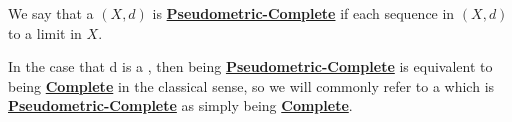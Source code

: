 \label{def:pseudometriccomplete}
\newcommand{\PseudometricComplete}[0]{\textbf{\hyperref[def:pseudometriccomplete]{Pseudometric-Complete}}\xspace}
\newcommand{\Complete}[0]{\textbf{\hyperref[def:pseudometriccomplete]{Complete}}\xspace}
\begin{df}
    We say that a \PseudometricSpace $(X,d)$ is 
    \PseudometricComplete if each 
	\PseudometricCauchySequence 
	sequence in $(X,d)$ 
	\PseudometricConverges to a limit in $X$.


	In the case that d is a \Metric, then
	being \PseudometricComplete is 
	equivalent to being \Complete
	in the classical sense, so 
	we will commonly refer to a \PseudometricSpace
	which is \PseudometricComplete as simply
	being \Complete. 
    \end{df}
